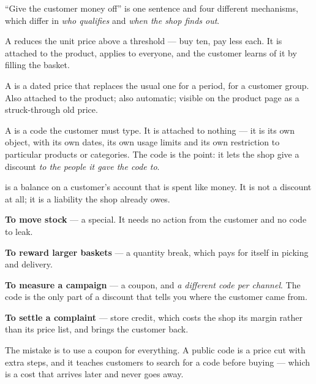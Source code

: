 ``Give the customer money off'' is one sentence and four different mechanisms,
which differ in \emph{who qualifies} and \emph{when the shop finds out}.

\begin{definitionbox}
A  reduces the unit price above a threshold --- buy ten,
pay less each. It is attached to the product, applies to everyone, and the
customer learns of it by filling the basket.

\smallskip
A  is a dated price that replaces the usual one for a period, for
a customer group. Also attached to the product; also automatic; visible on the
product page as a struck-through old price.

\smallskip
A  is a code the customer must type. It is attached to nothing
--- it is its own object, with its own dates, its own usage limits and its own
restriction to particular products or categories. The code is the point: it
lets the shop give a discount \emph{to the people it gave the code to}.

\smallskip
{} is a balance on a customer's account that is spent like
money. It is not a discount at all; it is a liability the shop already owes.
\end{definitionbox}

\begin{conceptbox}
\begin{tight}
  \item \textbf{To move stock} --- a special. It needs no action from the
        customer and no code to leak.
  \item \textbf{To reward larger baskets} --- a quantity break, which pays for
        itself in picking and delivery.
  \item \textbf{To measure a campaign} --- a coupon, and \emph{a different code
        per channel}. The code is the only part of a discount that tells you
        where the customer came from.
  \item \textbf{To settle a complaint} --- store credit, which costs the shop
        its margin rather than its price list, and brings the customer back.
\end{tight}

\smallskip
The mistake is to use a coupon for everything. A public code is a price cut
with extra steps, and it teaches customers to search for a code before buying
--- which is a cost that arrives later and never goes away.
\end{conceptbox}

